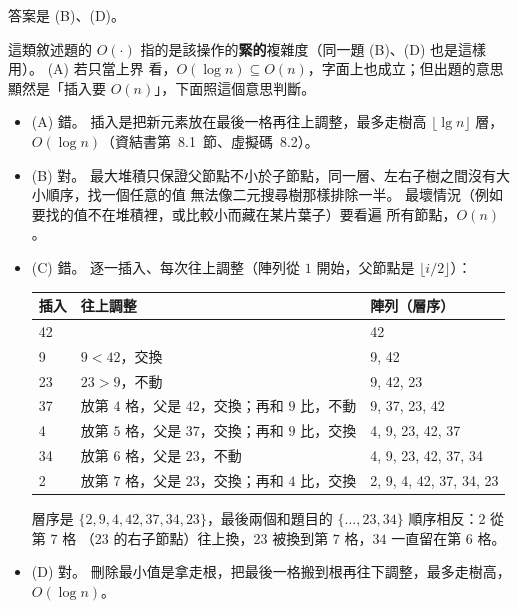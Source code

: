 \begin{pastsoln}
答案是 (B)、(D)。

這類敘述題的 $O(\cdot)$ 指的是該操作的\textbf{緊的}複雜度（同一題 (B)、(D) 也是這樣用）。 (A) 若只當上界
看，$O(\log n) \subseteq O(n)$，字面上也成立；但出題的意思顯然是「插入要 $O(n)$」，下面照這個意思判斷。

\begin{itemize}
\item (A) 錯。 插入是把新元素放在最後一格再往上調整，最多走樹高 $\lfloor \lg n \rfloor$ 層，
$O(\log n)$（資結書第~8.1~節、虛擬碼~8.2）。
\item (B) 對。 最大堆積只保證父節點不小於子節點，同一層、左右子樹之間沒有大小順序，找一個任意的值
無法像二元搜尋樹那樣排除一半。 最壞情況（例如要找的值不在堆積裡，或比較小而藏在某片葉子）要看遍
所有節點，$O(n)$。
\item (C) 錯。 逐一插入、每次往上調整（陣列從 $1$ 開始，父節點是 $\lfloor i/2 \rfloor$）：
\begin{center}
\small
\begin{tabular}{lll}
\toprule
插入 & 往上調整 & 陣列（層序） \\
\midrule
42 & & 42 \\
9 & $9 < 42$，交換 & 9, 42 \\
23 & $23 > 9$，不動 & 9, 42, 23 \\
37 & 放第 $4$ 格，父是 $42$，交換；再和 $9$ 比，不動 & 9, 37, 23, 42 \\
4 & 放第 $5$ 格，父是 $37$，交換；再和 $9$ 比，交換 & 4, 9, 23, 42, 37 \\
34 & 放第 $6$ 格，父是 $23$，不動 & 4, 9, 23, 42, 37, 34 \\
2 & 放第 $7$ 格，父是 $23$，交換；再和 $4$ 比，交換 & 2, 9, 4, 42, 37, 34, 23 \\
\bottomrule
\end{tabular}
\end{center}
層序是 $\{2, 9, 4, 42, 37, 34, 23\}$，最後兩個和題目的 $\{\ldots, 23, 34\}$ 順序相反：$2$ 從第 $7$ 格
（$23$ 的右子節點）往上換，$23$ 被換到第 $7$ 格，$34$ 一直留在第 $6$ 格。
\item (D) 對。 刪除最小值是拿走根，把最後一格搬到根再往下調整，最多走樹高，$O(\log n)$。
\end{itemize}
\end{pastsoln}
